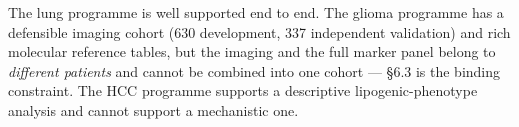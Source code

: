 \documentclass[11pt,a4paper]{article}
\begin{document}
\noindent
The lung programme is well supported end to end. The glioma programme has a defensible
imaging cohort (630 development, 337 independent validation) and rich molecular reference
tables, but the imaging and the full marker panel belong to \emph{different patients} and
cannot be combined into one cohort --- \S6.3 is the binding constraint. The HCC programme
supports a descriptive lipogenic-phenotype analysis and cannot support a mechanistic one.
\end{document}
